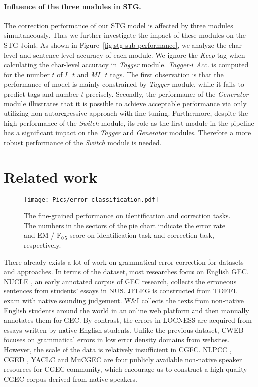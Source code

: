 \documentclass[11pt]{article}
\begin{document}
\paragraph{Influence of the three modules in STG.} The correction performance of our STG model is affected by three modules simultaneously. Thus we further investigate the impact of these modules on the STG-Joint. As shown in Figure~\ref{fig:stg-sub-performance}, we analyze the char-level and sentence-level accuracy of each module. We ignore the \emph{Keep} tag when calculating the char-level accuracy in \emph{Tagger} module. \emph{Tagger-$t$ Acc.} is computed for the number $t$ of \emph{I}\_$t$ and \emph{MI}\_$t$ tags.  The first observation is that the performance of model is mainly constrained by \emph{Tagger} module, while it fails to predict tags and number $t$ precisely. Secondly, the performance of the \emph{Generator} module illustrates that it is possible to achieve acceptable performance via only utilizing non-autoregressive approach with fine-tuning. Furthermore, despite the high performance of the \emph{Switch} module, its role as the first module in the pipeline has a significant impact on the \emph{Tagger} and \emph{Generator} modules. Therefore a more robust performance of the \emph{Switch} module is needed. 
\section{Related work}

\begin{figure}[t]
	\centering
	\texttt{[image: Pics/error\_classification.pdf]} 
	\caption{The fine-grained performance on identification and correction tasks. The numbers in the sectors of the pie chart indicate the error rate and EM / F$_{0.5}$ score on identification task and correction task, respectively.}
	\label{fig:error-classify}
\end{figure}
 
There already exists a lot of work on grammatical error correction for datasets and approaches. In terms of the dataset, most researches focus on English GEC. NUCLE \cite{dahlmeier2013building}, an early annotated corpus of GEC research, collects the erroneous sentences from students' essays in NUS. JFLEG \cite{napoles2017jfleg} is constructed from TOEFL exam with native sounding judgement. W\&I \cite{bryant2019bea} collects the texts from non-native English students around the world in an online web platform and then manually annotates them for GEC. By contrast, the errors in LOCNESS \cite{bryant2019bea} are acquired from essays written by native English students. Unlike the previous dataset, CWEB \cite{flachs2020grammatical} focuses on grammatical errors in low error density domains from websites. However, the scale of the data is relatively insufficient in CGEC. NLPCC \cite{zhao2018overview}, CGED \cite{rao2020overview}, YACLC \cite{wang2021yaclc} and MuCGEC \cite{zhang2022mucgec} are four publicly available non-native speaker resources for CGEC community, which encourage us to construct a high-quality CGEC corpus derived from native speakers.
\end{document}
